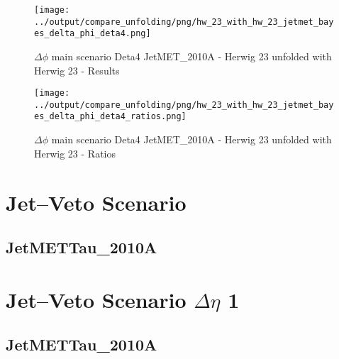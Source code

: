 \documentclass[11pt]{book}
\begin{document}
\begin{figure}[ht]
\centering
\texttt{[image: ../output/compare\_unfolding/png/hw\_23\_with\_hw\_23\_jetmet\_bayes\_delta\_phi\_deta4.png]}
\caption{$\Delta\phi$ main scenario Deta4 JetMET\_2010A - Herwig 23 unfolded with Herwig 23 - Results}
\label{hw_23_hw_23_jetmet_bayes_delta_phi_deta4_a}
\end{figure}

\begin{figure}[ht]
\centering
\texttt{[image: ../output/compare\_unfolding/png/hw\_23\_with\_hw\_23\_jetmet\_bayes\_delta\_phi\_deta4\_ratios.png]}
\caption{$\Delta\phi$ main scenario Deta4 JetMET\_2010A - Herwig 23 unfolded with Herwig 23 - Ratios}
\label{hw_23_hw_23_jetmet_bayes_delta_phi_deta4_b}
\end{figure}


\newpage
\chapter{Jet--Veto Scenario}
\section{JetMETTau\_2010A}



\newpage
\chapter{Jet--Veto Scenario $\Delta\eta$ 1}
\section{JetMETTau\_2010A}
\end{document}
